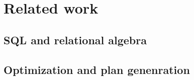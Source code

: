 \chapter{Related work}

\section{SQL and relational algebra}

\section{Optimization and plan genenration}
